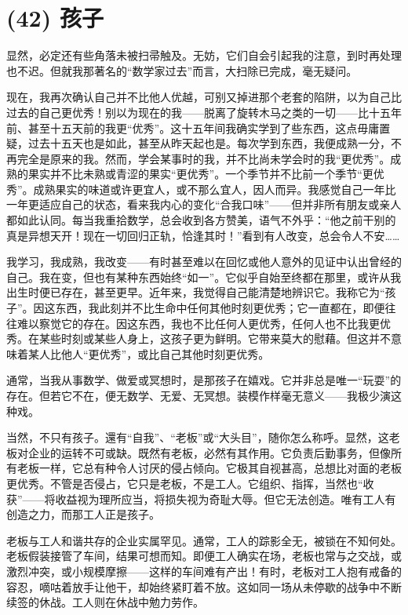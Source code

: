 \section{(42) 孩子}

显然，必定还有些角落未被扫帚触及。无妨，它们自会引起我的注意，到时再处理也不迟。但就我那著名的“数学家过去”而言，大扫除已完成，毫无疑问。

现在，我再次确认自己并不比他人优越，可别又掉进那个老套的陷阱，以为自己比过去的自己更优秀！别以为现在的我——脱离了旋转木马之类的一切——比十五年前、甚至十五天前的我更“优秀”。这十五年间我确实学到了些东西，这点毋庸置疑，过去十五天也是如此，甚至从昨天起也是。每次学到东西，我便成熟一分，不再完全是原来的我。然而，学会某事时的我，并不比尚未学会时的我“更优秀”。成熟的果实并不比未熟或青涩的果实“更优秀”。一个季节并不比前一个季节“更优秀”。成熟果实的味道或许更宜人，或不那么宜人，因人而异。我感觉自己一年比一年更适应自己的状态，看来我内心的变化“合我口味”——但并非所有朋友或亲人都如此认同。每当我重拾数学，总会收到各方赞美，语气不外乎：“他之前干别的真是异想天开！现在一切回归正轨，恰逢其时！”看到有人改变，总会令人不安……

我学习，我成熟，我改变——有时甚至难以在回忆或他人意外的见证中认出曾经的自己。我在变，但也有某种东西始终“如一”。它似乎自始至终都在那里，或许从我出生时便已存在，甚至更早。近年来，我觉得自己能清楚地辨识它。我称它为“孩子”。因这东西，我此刻并不比生命中任何其他时刻更优秀；它一直都在，即便往往难以察觉它的存在。因这东西，我也不比任何人更优秀，任何人也不比我更优秀。在某些时刻或某些人身上，这孩子更为鲜明。它带来莫大的慰藉。但这并不意味着某人比他人“更优秀”，或比自己其他时刻更优秀。

通常，当我从事数学、做爱或冥想时，是那孩子在嬉戏。它并非总是唯一“玩耍”的存在。但若它不在，便无数学、无爱、无冥想。装模作样毫无意义——我极少演这种戏。

当然，不只有孩子。還有“自我”、“老板”或“大头目”，随你怎么称呼。显然，这老板对企业的运转不可或缺。既然有老板，必然有其作用。它负责后勤事务，但像所有老板一样，它总有种令人讨厌的侵占倾向。它极其自视甚高，总想比对面的老板更优秀。不管是否侵占，它只是老板，不是工人。它组织、指挥，当然也“收获”——将收益视为理所应当，将损失视为奇耻大辱。但它无法创造。唯有工人有创造之力，而那工人正是孩子。

老板与工人和谐共存的企业实属罕见。通常，工人的踪影全无，被锁在不知何处。老板假装接管了车间，结果可想而知。即便工人确实在场，老板也常与之交战，或激烈冲突，或小规模摩擦——这样的车间难有产出！有时，老板对工人抱有戒备的容忍，嘀咕着放手让他干，却始终紧盯着不放。这如同一场从未停歇的战争中不断续签的休战。工人则在休战中勉力劳作。

